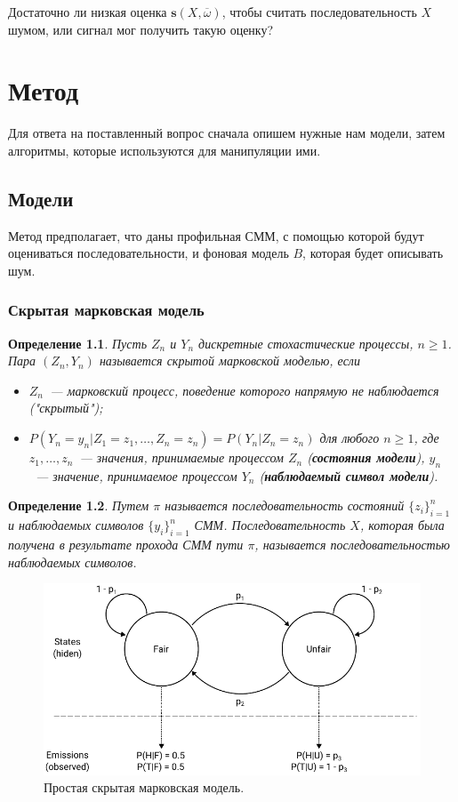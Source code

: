 \documentclass[specialist,
substylefile = spbu_report.rtx,
subf,href,colorlinks=true, 12pt]{disser}
\newtheorem{defenition}{Определение}
\begin{document}
		Достаточно ли низкая оценка $\boldsymbol{s}(X, \overline{\omega})$, чтобы считать последовательность $X$ шумом, или сигнал мог получить такую оценку?
		
	\chapter{Метод}
		Для ответа на поставленный вопрос сначала опишем нужные нам модели, затем алгоритмы, которые используются для манипуляции ими.
		\section{Модели}
			Метод предполагает, что даны профильная СММ, с помощью которой будут оцениваться последовательности, и фоновая модель $B$, которая будет описывать шум.
			\subsection{Скрытая марковская модель}
				\begin{defenition}
					Пусть $Z_{n}$ и $Y_{n}$ дискретные стохастические процессы, $n \geq 1$. Пара $(Z_{n}, Y_{n})$ называется скрытой марковской моделью, если
					\begin{itemize}
						\item $Z_{n}$~--- марковский процесс, поведение которого напрямую не наблюдается ("скрытый");
						\item $P(Y_{n} = y_{n}|Z_{1} = z_{1},\dots, Z_{n} = z_{n}) = P(Y_{n}|Z_{n}=z_{n})$ для любого $n \geq 1$, где $z_{1},\dots,z_{n}$~--- значения, принимаемые процессом  $Z_{n}$ (\textbf{состояния модели}), $ y_{n}$~--- значение, принимаемое процессом $Y_{n}$ (\textbf{наблюдаемый символ модели}).
					\end{itemize}
				\end{defenition}	
				
				\begin{defenition}
					Путем $\pi$ называется последовательность состояний $\{z_i\}_{i=1}^{n}$ и наблюдаемых символов $\{y_i\}_{i=1}^{n}$ СММ.
					Последовательность $X$, которая была получена в результате прохода СММ пути $\pi$, называется последовательностью наблюдаемых символов.
				\end{defenition}
				
				\begin{figure}[h]
					\centering
					\includegraphics[width=12cm]{figure1}
					\caption{Простая скрытая марковская модель.} 
					\label{fg:2}
				\end{figure}
			
\end{document}

